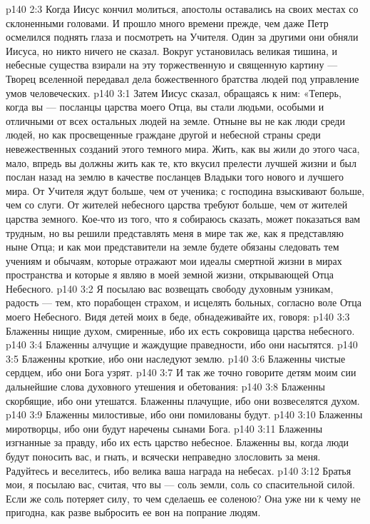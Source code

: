 \vs p140 2:3 \pc Когда Иисус кончил молиться, апостолы оставались на своих местах со склоненными головами. И прошло много времени прежде, чем даже Петр осмелился поднять глаза и посмотреть на Учителя. Один за другими они обняли Иисуса, но никто ничего не сказал. Вокруг установилась великая тишина, и небесные существа взирали на эту торжественную и священную картину --- Творец вселенной передавал дела божественного братства людей под управление умов человеческих.
\vs p140 3:1 Затем Иисус сказал, обращаясь к ним: «Теперь, когда вы --- посланцы царства моего Отца, вы стали людьми, особыми и отличными от всех остальных людей на земле. Отныне вы не как люди среди людей, но как просвещенные граждане другой и небесной страны среди невежественных созданий этого темного мира. Жить, как вы жили до этого часа, мало, впредь вы должны жить как те, кто вкусил прелести лучшей жизни и был послан назад на землю в качестве посланцев Владыки того нового и лучшего мира. От Учителя ждут больше, чем от ученика; с господина взыскивают больше, чем со слуги. От жителей небесного царства требуют больше, чем от жителей царства земного. Кое\hyp{}что из того, что я собираюсь сказать, может показаться вам трудным, но вы решили представлять меня в мире так же, как я представляю ныне Отца; и как мои представители на земле будете обязаны следовать тем учениям и обычаям, которые отражают мои идеалы смертной жизни в мирах пространства и которые я являю в моей земной жизни, открывающей Отца Небесного.
\vs p140 3:2 Я посылаю вас возвещать свободу духовным узникам, радость --- тем, кто порабощен страхом, и исцелять больных, согласно воле Отца моего Небесного. Видя детей моих в беде, обнадеживайте их, говоря:
\vs p140 3:3 Блаженны нищие духом, смиренные, ибо их есть сокровища царства небесного.
\vs p140 3:4 Блаженны алчущие и жаждущие праведности, ибо они насытятся.
\vs p140 3:5 Блаженны кроткие, ибо они наследуют землю.
\vs p140 3:6 Блаженны чистые сердцем, ибо они Бога узрят.
\vs p140 3:7 И так же точно говорите детям моим сии дальнейшие слова духовного утешения и обетования:
\vs p140 3:8 Блаженны скорбящие, ибо они утешатся. Блаженны плачущие, ибо они возвеселятся духом.
\vs p140 3:9 Блаженны милостивые, ибо они помилованы будут.
\vs p140 3:10 Блаженны миротворцы, ибо они будут наречены сынами Бога.
\vs p140 3:11 Блаженны изгнанные за правду, ибо их есть царство небесное. Блаженны вы, когда люди будут поносить вас, и гнать, и всячески неправедно злословить за меня. Радуйтесь и веселитесь, ибо велика ваша награда на небесах.
\vs p140 3:12 Братья мои, я посылаю вас, считая, что вы --- соль земли, соль со спасительной силой. Если же соль потеряет силу, то чем сделаешь ее соленою? Она уже ни к чему не пригодна, как разве выбросить ее вон на попрание людям.
